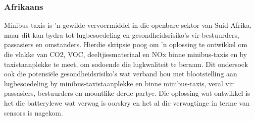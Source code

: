 \subsubsection*{Afrikaans}
Minibus-taxis is 'n gewilde vervoermiddel in die openbare sektor van Suid-Afrika, maar dit kan bydra tot lugbesoedeling en gesondheidsrisiko's vir bestuurders, passasiers en omstanders. Hierdie skripsie poog om 'n oplossing te ontwikkel om die vlakke van CO2, VOC, deeltjiesmateriaal en NOx binne minibus-taxis en by taxistaanplekke te meet, om sodoende die lugkwaliteit te beraam.
Dit ondersoek ook die potensiële gesondheidsrisiko's wat verband hou met blootstelling aan lugbesoedeling by minibus-taxistaanplekke en binne minibus-taxis, veral vir passasiers, bestuurders en moontlike derde partye. Die oplossing wat ontwikkel is het die batterylewe wat verwag is oorskry en het al die verwagtinge in terme van sensors is nagekom.

